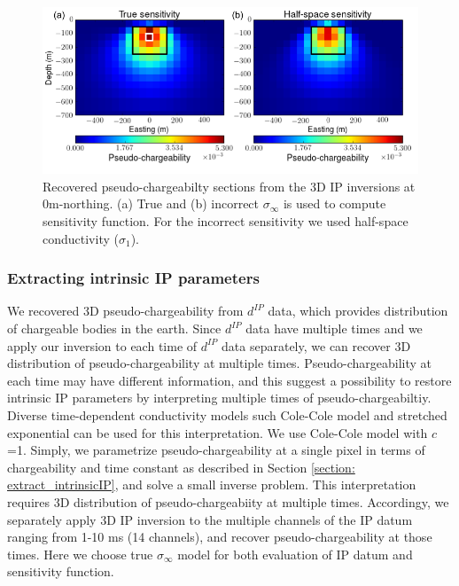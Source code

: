 \documentclass[a4paper, 11pt]{article}
\newcommand{\siginf}{\sigma_\infty}
\newcommand{\dip}{d^{IP}}
\begin{document}
\begin{figure}[htb]
  \centering
  \includegraphics[width=1.\textwidth]{figures/True_vs_approx_sensitivity.png}
  \caption{Recovered pseudo-chargeabilty sections from the 3D IP inversions at 0m-northing.  (a) True and (b) incorrect $\siginf$ is used to compute sensitivity function. For the incorrect sensitivity we used half-space conductivity ($\sigma_1$).}
  \label{F:True_vs_approx_sensitivity}
\end{figure}
\clearpage

\subsubsection{Extracting intrinsic IP parameters}
We recovered 3D pseudo-chargeability from $\dip$ data, which provides distribution of chargeable bodies in the earth. 
Since $\dip$ data have multiple times and we apply our inversion to each time of $\dip$ data separately, we can recover 3D distribution of pseudo-chargeability at multiple times. 
Pseudo-chargeability at each time may have different information, and this suggest a possibility to restore intrinsic IP parameters by interpreting multiple times of pseudo-chargeabiltiy. 
Diverse time-dependent conductivity models such Cole-Cole model and stretched exponential can be used for this interpretation.
We use Cole-Cole model with $c$=1. 
Simply, we parametrize pseudo-chargeability at a single pixel in terms of chargeability and time constant as described in Section \ref{section: extract_intrinsicIP}, and solve a small inverse problem.
This interpretation requires 3D distribution of pseudo-chargeabiity at multiple times. 
Accordingy, we separately apply 3D IP inversion to the multiple channels of the IP datum ranging from 1-10 ms (14 channels), and recover pseudo-chargeability at those times. 
Here we choose true $\siginf$ model for both evaluation of IP datum and sensitivity function. 
\end{document}
